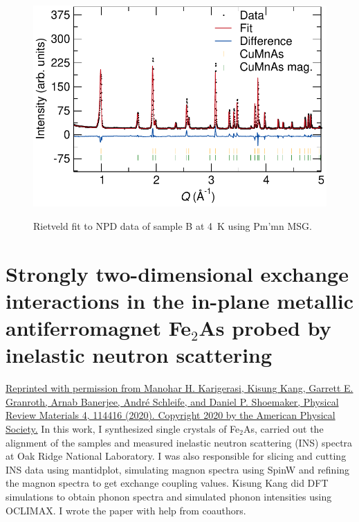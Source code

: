 \documentclass[10pt,doublespacing,edeposit]{uiucthesis2020}
\begin{document}
\begin{mainmatter}
\begin{figure}[h]
\centering\includegraphics[width=0.7\columnwidth]{figures/ch7/suppl_ECHIDNA_4K_sample_B_cropped.pdf} \\
\caption{\label{fig:4K_mag_structure}
Rietveld fit to NPD data of sample B at 4~K using Pm'mn MSG.
} 
\end{figure}


\chapter{Strongly two-dimensional exchange interactions in the in-plane metallic antiferromagnet Fe$_2$As probed by inelastic neutron scattering}

\hfill \break


\href{https://doi.org/10.1103/PhysRevMaterials.4.114416}{Reprinted with permission from Manohar H. Karigerasi, Kisung Kang, Garrett E. Granroth, Arnab Banerjee, Andr\'e Schleife, and Daniel P. Shoemaker, Physical Review Materials 4, 114416 (2020). Copyright 2020 by the American Physical Society.} In this work, I synthesized single crystals of Fe$_2$As, carried out the alignment of the samples and measured inelastic neutron scattering (INS) spectra at Oak Ridge National Laboratory. I was also responsible for slicing and cutting INS data using mantidplot, simulating magnon spectra using SpinW and refining the magnon spectra to get exchange coupling values. Kisung Kang did DFT simulations to obtain phonon spectra and simulated phonon intensities using OCLIMAX. I wrote the paper with help from coauthors.




\end{mainmatter}
\end{document}
